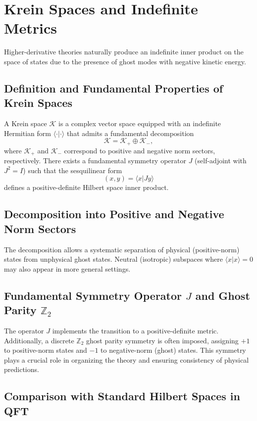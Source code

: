 \documentclass{article}
\begin{document}
\section{Krein Spaces and Indefinite Metrics}
\label{sec:krein}

Higher-derivative theories naturally produce an indefinite inner product on the space of states due to the presence of ghost modes with negative kinetic energy.

\subsection{Definition and Fundamental Properties of Krein Spaces}

A Krein space $\mathcal{K}$ is a complex vector space equipped with an indefinite Hermitian form $\langle \cdot | \cdot \rangle$ that admits a fundamental decomposition
\[
\mathcal{K} = \mathcal{K}_+ \oplus \mathcal{K}_-,
\]
where $\mathcal{K}_+$ and $\mathcal{K}_-$ correspond to positive and negative norm sectors, respectively. There exists a fundamental symmetry operator $J$ (self-adjoint with $J^2 = I$) such that the sesquilinear form
\[
(x, y) = \langle x | J y \rangle
\]
defines a positive-definite Hilbert space inner product.

\subsection{Decomposition into Positive and Negative Norm Sectors}

The decomposition allows a systematic separation of physical (positive-norm) states from unphysical ghost states. Neutral (isotropic) subspaces where $\langle x | x \rangle = 0$ may also appear in more general settings.

\subsection{Fundamental Symmetry Operator \(J\) and Ghost Parity \(\mathbb{Z}_2\)}

The operator $J$ implements the transition to a positive-definite metric. Additionally, a discrete $\mathbb{Z}_2$ ghost parity symmetry is often imposed, assigning $+1$ to positive-norm states and $-1$ to negative-norm (ghost) states. This symmetry plays a crucial role in organizing the theory and ensuring consistency of physical predictions.

\subsection{Comparison with Standard Hilbert Spaces in QFT}
\end{document}
